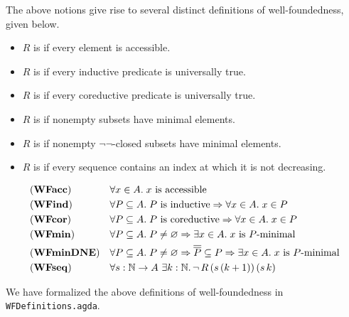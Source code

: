 The above notions give rise to several distinct definitions of well-foundedness, given below.

\begin{definition} \label{def:WFproperties} \hfill
  \begin{itemize}
    \item $R$ is  if every element is accessible.
    \item $R$ is  if every inductive predicate is universally true.
    \item $R$ is  if every coreductive predicate is universally true.
    \item $R$ is  if nonempty subsets have minimal elements.
    \item $R$ is  if nonempty $\lnot \lnot$-closed subsets have minimal elements.
    \item $R$ is  if every sequence contains an index at which it is not decreasing.
  \end{itemize}
      \begin{align*}
        &(\mathbf{WFacc})  &&\forall x \in A.\; x \text{ is accessible} \\
        &(\mathbf{WFind}) &&\forall P \subseteq A.\;\text{$P$ is inductive} \Rightarrow \forall x \in A.\; x \in P\\
        &(\mathbf{WFcor}) &&\forall P \subseteq A.\;\text{$P$ is coreductive} \Rightarrow \forall x \in A.\; x \in P\\
        &(\mathbf{WFmin})  &&\forall P \subseteq A.\; P \neq \varnothing \Rightarrow
        \exists x \in A.\; \text{$x$ is $P$-minimal}\\
        &(\mathbf{WFminDNE}) &&\forall P \subseteq A.\; P \neq \varnothing \Rightarrow \overline{\overline{P}} \subseteq P \Rightarrow
        \exists x \in A.\; \text{$x$ is $P$-minimal}\\
        &(\mathbf{WFseq}) &&\forall s : \mathbb{N} \to A\ \exists k : \mathbb{N}.\, \lnot \, R \,(s\,(k+1))\,(s\,k)
      \end{align*}
\end{definition}
We have formalized the above definitions of well-foundedness in \texttt{WFDefinitions.agda}.

